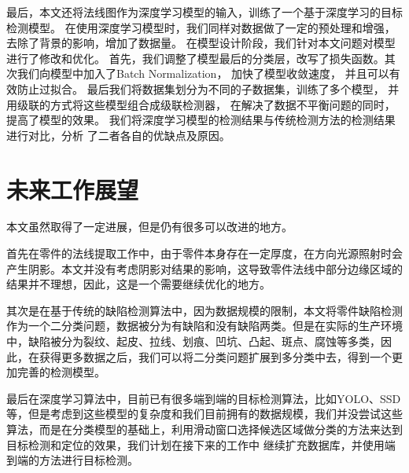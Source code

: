 最后，本文还将法线图作为深度学习模型的输入，训练了一个基于深度学习的目标检测模型。
在使用深度学习模型时，我们同样对数据做了一定的预处理和增强，去除了背景的影响，增加了数据量。
在模型设计阶段，我们针对本文问题对模型进行了修改和优化。
首先，我们调整了模型最后的分类层，改写了损失函数。其次我们向模型中加入了Batch Normalization，
加快了模型收敛速度，
并且可以有效防止过拟合。
最后我们将数据集划分为不同的子数据集，训练了多个模型，
并用级联的方式将这些模型组合成级联检测器，
在解决了数据不平衡问题的同时，提高了模型的效果。
我们将深度学习模型的检测结果与传统检测方法的检测结果进行对比，分析
了二者各自的优缺点及原因。


\section{未来工作展望}

本文虽然取得了一定进展，但是仍有很多可以改进的地方。

首先在零件的法线提取工作中，由于零件本身存在一定厚度，在方向光源照射时会产生阴影。本文并没有考虑阴影对结果的影响，这导致零件法线中部分边缘区域的结果并不理想，因此，这是一个需要继续优化的地方。

其次是在基于传统的缺陷检测算法中，因为数据规模的限制，本文将零件缺陷检测作为一个二分类问题，数据被分为有缺陷和没有缺陷两类。但是在实际的生产环境中，缺陷被分为裂纹、起皮、拉线、划痕、凹坑、凸起、斑点、腐蚀等多类，因此，在获得更多数据之后，我们可以将二分类问题扩展到多分类中去，得到一个更加完善的检测模型。

最后在深度学习算法中，目前已有很多端到端的目标检测算法，比如YOLO、SSD等，但是考虑到这些模型的复杂度和我们目前拥有的数据规模，我们并没尝试这些算法，而是在分类模型的基础上，利用滑动窗口选择候选区域做分类的方法来达到目标检测和定位的效果，我们计划在接下来的工作中
继续扩充数据库，并使用端到端的方法进行目标检测。